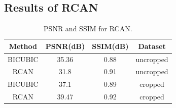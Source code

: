 \begin{table}[H]
\subsection{Results of RCAN}
\centering
\caption{PSNR and SSIM for RCAN.}
\begin{tabular}{ |c|c|c|c| }
\hline
 Method & PSNR(dB) & SSIM(dB) & Dataset \\ 
  \hline
 BICUBIC &	35.36 &	0.88 & uncropped \\
 RCAN &	31.8 &	0.91 & uncropped \\
 BICUBIC &	37.1 &	0.89 & cropped \\
 RCAN &	39.47	& 0.92 & cropped\\
\hline
\end{tabular}
\label{Table:5.3}
\end{table}
